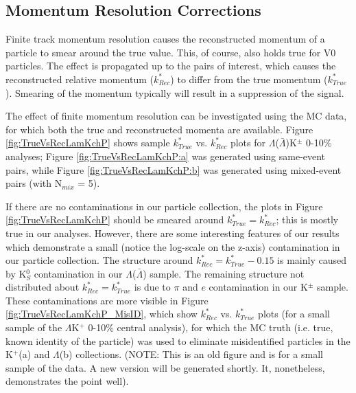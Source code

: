 \documentclass[../AnalysisNoteJBuxton.tex]{subfiles}
\begin{document}
\subsection{Momentum Resolution Corrections}
\label{MomentumResolutionCorrections}

Finite track momentum resolution causes the reconstructed momentum of a particle to smear around the true value.
This, of course, also holds true for V0 particles.
The effect is propagated up to the pairs of interest, which causes the reconstructed relative momentum ($k^{*}_{Rec}$) to differ from the true momentum ($k^{*}_{True}$).
Smearing of the momentum typically will result in a suppression of the signal.

The effect of finite momentum resolution can be investigated using the MC data, for which both the true and reconstructed momenta are available.
Figure \ref{fig:TrueVsRecLamKchP} shows sample $k^{*}_{True}$ vs. $k^{*}_{Rec}$ plots for $\Lambda$($\bar{\Lambda}$)K$^{\pm}$ 0-10\% analyses; Figure \ref{fig:TrueVsRecLamKchP:a} was generated using same-event pairs, while Figure \ref{fig:TrueVsRecLamKchP:b} was generated using mixed-event pairs (with N$_{mix}$ = 5).  


If there are no contaminations in our particle collection, the plots in Figure \ref{fig:TrueVsRecLamKchP} should be smeared around $k^{*}_{True} = k^{*}_{Rec}$; this is mostly true in our analyses.
However, there are some interesting features of our results which demonstrate a small (notice the log-scale on the z-axis) contamination in our particle collection.
The structure around $k^{*}_{Rec} = k^{*}_{True}-0.15$ is mainly caused by K$^{0}_{S}$ contamination in our $\Lambda$($\bar{\Lambda}$) sample.
The remaining structure not distributed about $k^{*}_{Rec} = k^{*}_{True}$ is due to $\pi$ and $e$ contamination in our K$^{\pm}$ sample.
These contaminations are more visible in Figure \ref{fig:TrueVsRecLamKchP_MisID}, which show $k^{*}_{Rec}$ vs. $k^{*}_{True}$ plots (for a small sample of the $\Lambda$K$^{+}$ 0-10\% central analysis), for which the MC truth (i.e. true, known identity of the particle) was used to eliminate misidentified particles in the K$^{+}$(a) and $\Lambda$(b) collections. (NOTE: This is an old figure and is for a small sample of the data.  A new version will be generated shortly.  It, nonetheless, demonstrates the point well).
\end{document}
